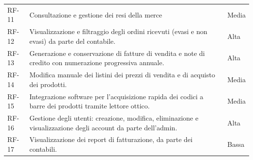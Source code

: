 \documentclass[a4paper,12pt]{article}
\begin{document}
\begin{longtable}{@{} L{0.13\textwidth} L{0.67\textwidth} L{0.14\textwidth} @{}}
    RF-11       & Consultazione e gestione dei resi della merce                                                             & Media             \\
    RF-12       & Visualizzazione e filtraggio degli ordini ricevuti (evasi e non evasi) da parte del contabile.            & Alta              \\
    RF-13       & Generazione e conservazione di fatture di vendita e note di credito con numerazione progressiva annuale.  & Alta              \\
    RF-14       & Modifica manuale dei listini dei prezzi di vendita e di acquisto dei prodotti.                            & Media             \\
    RF-15       & Integrazione software per l'acquisizione rapida dei codici a barre dei prodotti tramite lettore ottico.    & Media             \\
    RF-16       & Gestione degli utenti: creazione, modifica, eliminazione e visualizzazione degli account da parte dell'admin. & Alta              \\
    RF-17       & Visualizzazione dei report di fatturazione, da parte dei contabili.                                        & Bassa             \\
    \bottomrule
\end{longtable}
\end{document}
